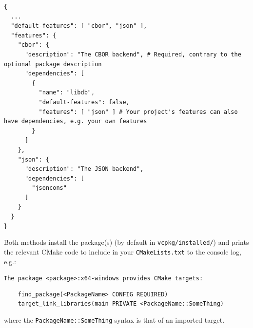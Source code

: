\documentclass[table, xcdraw]{article}%
\begin{document}
\begin{itemize}
    \begin{verbatim}
{
  ...
  "default-features": [ "cbor", "json" ],
  "features": {
    "cbor": {
      "description": "The CBOR backend", # Required, contrary to the optional package description
      "dependencies": [
        {
          "name": "libdb",
          "default-features": false,
          "features": [ "json" ] # Your project's features can also have dependencies, e.g. your own features
        }
      ]
    },
    "json": {
      "description": "The JSON backend",
      "dependencies": [
        "jsoncons"
      ]
    }
  }
}
    \end{verbatim}
    
\end{itemize}

Both methods install the package(s) (by default in \texttt{vcpkg/installed/}) and prints the relevant CMake code to include in your \texttt{CMakeLists.txt} to the console log, e.g.:


\texttt{The package <package>:x64-windows provides CMake targets:}
\begin{verbatim}
    find_package(<PackageName> CONFIG REQUIRED)
    target_link_libraries(main PRIVATE <PackageName::SomeThing)
\end{verbatim}

where the \texttt{PackageName::SomeThing} syntax is that of an imported target.
\end{document}

